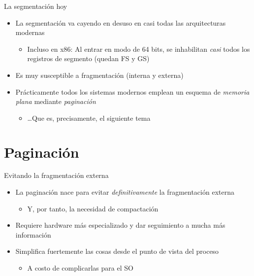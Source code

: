 \documentclass[presentation]{beamer}
\newcommand{\rarrow}{$\rightarrow$\hskip 0.5em}
\begin{document}
\begin{frame}[label={sec:orgf7acc11}]{La segmentación hoy}
\begin{itemize}
\item La segmentación va cayendo en desuso en casi todas las arquitecturas
modernas
\begin{itemize}
\item Incluso en x86: Al entrar en modo de 64 bits, se inhabilitan
\emph{casi} todos los registros de segmento (quedan FS y GS)
\end{itemize}
\item Es muy susceptible a fragmentación (interna y externa)
\item Prácticamente todos los sistemas modernos emplean un esquema de
\emph{memoria plana} mediante \emph{paginación}
\begin{itemize}
\item \ldots{}Que es, precisamente, el siguiente tema
\end{itemize}
\end{itemize}
\end{frame}

\section{Paginación}
\label{sec:org404c71b}

\begin{frame}[label={sec:orgcb055d9}]{Evitando la fragmentación externa}
\begin{itemize}
\item La paginación nace para evitar \emph{definitivamente} la fragmentación
externa
\begin{itemize}
\item Y, por tanto, la necesidad de compactación
\end{itemize}
\item Requiere hardware más especializado y dar seguimiento a mucha más
información
\item Simplifica fuertemente las cosas desde el punto de vista del proceso
\begin{itemize}
\item A costo de complicarlas para el SO
\end{itemize}
\end{itemize}
\end{frame}
\end{document}
